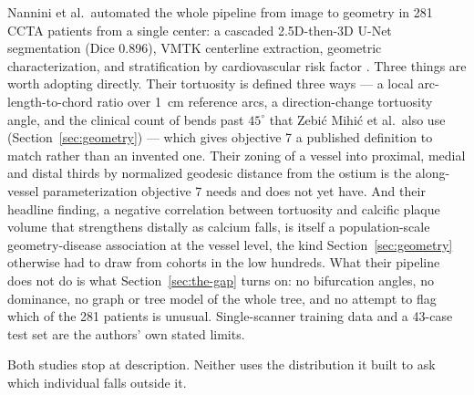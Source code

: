 Nannini et al.\ automated the whole pipeline from image to geometry in 281 CCTA patients from a
single center: a cascaded 2.5D-then-3D U-Net segmentation (Dice 0.896), VMTK centerline extraction,
geometric characterization, and stratification by cardiovascular risk factor
\cite{nannini2024characterization}.
Three things are worth adopting directly.
Their tortuosity is defined three ways --- a local arc-length-to-chord ratio over 1~cm reference arcs,
a direction-change tortuosity angle, and the clinical count of bends past $45^\circ$ that Zebi\'c
Mihi\'c et al.\ also use \cite{zebicmihic2023tortuosity} (Section~\ref{sec:geometry}) --- which gives
objective 7 a published definition to match rather than an invented one.
Their zoning of a vessel into proximal, medial and distal thirds by normalized geodesic distance
from the ostium is the along-vessel parameterization objective 7 needs and does not yet have.
And their headline finding, a negative correlation between tortuosity and calcific plaque volume that
strengthens distally as calcium falls, is itself a population-scale geometry-disease association at
the vessel level, the kind Section~\ref{sec:geometry} otherwise had to draw from cohorts in the low
hundreds.
What their pipeline does not do is what Section~\ref{sec:the-gap} turns on: no bifurcation angles, no
dominance, no graph or tree model of the whole tree, and no attempt to flag which of the 281 patients
is unusual. Single-scanner training data and a 43-case test set are the authors' own stated limits.

Both studies stop at description.
Neither uses the distribution it built to ask which individual falls outside it.
